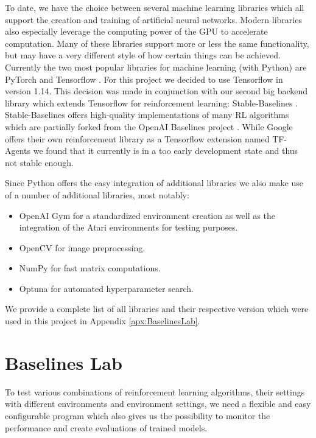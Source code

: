 To date, we have the choice between several machine learning libraries which all support the creation and training of artificial neural networks. Modern libraries also especially leverage the computing power of the GPU to accelerate computation. Many of these libraries support more or less the same functionality, but may have a very different style of how certain things can be achieved. Currently the two most popular libraries for machine learning (with Python) are PyTorch \cite{paszke2019pytorch} and Tensorflow \cite{abadi2016tensorflow}. For this project we decided to use Tensorflow in version 1.14. This decision was made in conjunction with our second big backend library which extends Tensorflow for reinforcement learning: Stable-Baselines \cite{stable-baselines}. Stable-Baselines offers high-quality implementations of many RL algorithms which are partially forked from the OpenAI Baselines project \cite{baselines}. While Google offers their own reinforcement library as a Tensorflow extension named TF-Agents \cite{TFAgents} we found that it currently is in a too early development state and thus not stable enough.

Since Python offers the easy integration of additional libraries we also make use of a number of additional libraries, most notably:
\begin{itemize}
    \item OpenAI Gym \cite{openAIgym} for a standardized environment creation as well as the integration of the Atari environments for testing purposes.
    \item OpenCV \cite{opencv_library} for image preprocessing.
    \item NumPy \cite{oliphant2006guide} for fast matrix computations.
    \item Optuna \cite{akiba2019optuna} for automated hyperparameter search.
\end{itemize}

We provide a complete list of all libraries and their respective version which were used in this project in Appendix \ref{apx:BaselinesLab}.  

\section{Baselines Lab} \label{sec:BaselinesLab}
To test various combinations of reinforcement learning algorithms, their settings with different environments and environment settings, we need a flexible and easy configurable program which also gives us the possibility to monitor the performance and create evaluations of trained models. 

